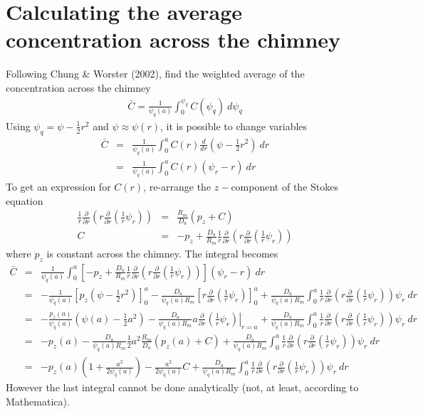 \documentclass{article}
\begin{document}
\section{Calculating the average concentration across the chimney}
Following Chung \& Worster (2002), find the weighted average of the concentration across the chimney
\begin{eqnarray}
\bar{C} = \frac{1}{\psi_q(a)} \int_0^{\psi_q} C(\psi_q)  \: d\psi_q
\end{eqnarray}
Using $\psi_q = \psi - \frac{1}{2} r^2$ and $\psi \approx \psi(r)$, it is possible to change variables
\begin{eqnarray}
\bar{C} &=& \frac{1}{\psi_q(a)} \int_0^{a} C(r) \frac{d}{dr} (\psi - \frac{1}{2} r^2) \: dr \\
&=& \frac{1}{\psi_q(a)} \int_0^{a} C(r) (\psi_r - r) \: dr
\end{eqnarray}
To get an expression for $C(r)$, re-arrange the $z-$component of the Stokes equation
\begin{eqnarray}
\frac{1}{r} \frac{\partial}{\partial r} \left( r \frac{\partial}{\partial r} \left(\frac{1}{r} \psi_r \right) \right) &=& \frac{R_m}{D_a} \left( p_z + C \right) \\
C &=& -p_z + \frac{D_a}{R_m} \frac{1}{r} \frac{\partial}{\partial r} \left( r \frac{\partial}{\partial r} \left(\frac{1}{r} \psi_r \right) \right)
\end{eqnarray}
where $p_z$ is constant across the chimney. The integral becomes
\begin{eqnarray}
\bar{C} &=&  \frac{1}{\psi_q(a)} \int_0^{a} \left[ -p_z + \frac{D_a}{R_m} \frac{1}{r} \frac{\partial}{\partial r} \left( r \frac{\partial}{\partial r} \left(\frac{1}{r} \psi_r \right) \right) \right] (\psi_r - r) \: dr \\
&=& - \frac{1}{\psi_q(a)} \left[ p_z \left( \psi - \frac{1}{2} r^2 \right) \right]_0^a -             \frac{D_a}{\psi_q(a) R_m} \left[  r \frac{\partial}{\partial r} \left(\frac{1}{r} \psi_r \right) \right]_0^a +                    \frac{D_a}{\psi_q(a) R_m}  \int_0^{a} \frac{1}{r} \frac{\partial}{\partial r} \left( r \frac{\partial}{\partial r} \left(\frac{1}{r} \psi_r \right) \right) \psi_r \: dr \\
&=& - \frac{p_z(a)}{\psi_q(a)} \left(\psi(a) - \frac{1}{2} a^2 \right)  -       \frac{D_a}{\psi_q(a) R_m} a \left. \frac{\partial}{\partial r} \left(\frac{1}{r} \psi_r \right)  \right|_{r=a}              + \frac{D_a}{\psi_q(a) R_m}  \int_0^{a} \frac{1}{r} \frac{\partial}{\partial r} \left( r \frac{\partial}{\partial r} \left(\frac{1}{r} \psi_r \right) \right) \psi_r \: dr \\
&=& -p_z(a) -       \frac{D_a}{\psi_q(a) R_m}  \frac{1}{2} a^2 \frac{R_m}{D_a} (p_z(a) + C)               + \frac{D_a}{\psi_q(a) R_m}  \int_0^{a} \frac{1}{r} \frac{\partial}{\partial r} \left( r \frac{\partial}{\partial r} \left(\frac{1}{r} \psi_r \right) \right) \psi_r \: dr \\
&=& -p_z(a) \left(1 + \frac{a^2}{2 \psi_q(a)}\right) -       \frac{a^2 }{2\psi_q(a) }  C              + \frac{D_a}{\psi_q(a) R_m}  \int_0^{a} \frac{1}{r} \frac{\partial}{\partial r} \left( r \frac{\partial}{\partial r} \left(\frac{1}{r} \psi_r \right) \right) \psi_r \: dr 
\end{eqnarray}
However the last integral cannot be done analytically (not, at least, according to Mathematica).
\end{document}
